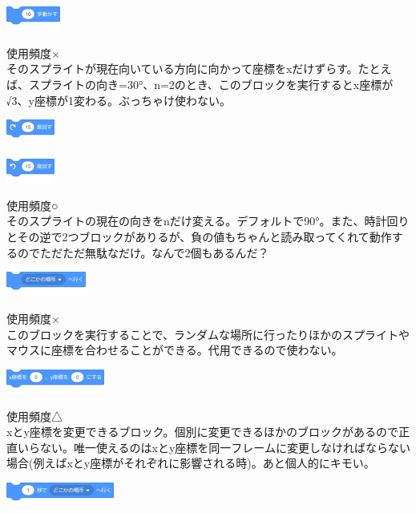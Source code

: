 \documentclass[b5paper,10pt]{jsarticle}
\begin{document}
\begin{multicols*}{3}
\begin{itembox}{1}
\includegraphics[height=8mm]{images/motion_1.png}
\end{itembox}
使用頻度×\\
そのスプライトが現在向いている方向に向かって座標をxだけずらす。たとえば、スプライトの向き=30°、n=2のとき、このブロックを実行するとx座標が√3、y座標が1変わる。ぶっちゃけ使わない。
\begin{itembox}{2}
\includegraphics[height=8mm]{images/motion_2.png}

\includegraphics[height=8mm]{images/motion_3.png}
\end{itembox}
使用頻度○\\
そのスプライトの現在の向きをnだけ変える。デフォルトで90°。また、時計回りとその逆で2つブロックがありるが、負の値もちゃんと読み取ってくれて動作するのでただただ無駄なだけ。なんで2個もあるんだ？
\begin{itembox}{3}
\includegraphics[height=8mm]{images/motion_4.png}
\end{itembox}
使用頻度×\\
このブロックを実行することで、ランダムな場所に行ったりほかのスプライトやマウスに座標を合わせることができる。代用できるので使わない。
\begin{itembox}{4}
\includegraphics[height=8mm]{images/motion_5.png}
\end{itembox}
使用頻度△\\
xとy座標を変更できるブロック。個別に変更できるほかのブロックがあるので正直いらない。唯一使えるのはxとy座標を同一フレームに変更しなければならない場合(例えばxとy座標がそれぞれに影響される時)。あと個人的にキモい。
\begin{itembox}{5}
\includegraphics[height=8mm]{images/motion_6.png}

\end{itembox}
\end{multicols*}
\end{document}
